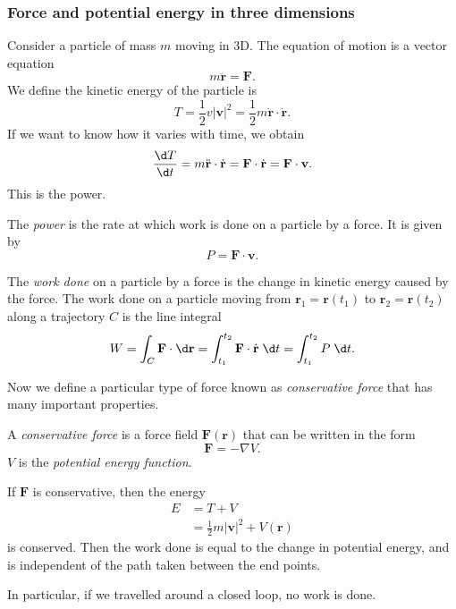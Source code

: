 \documentclass[a4paper]{article}
\begin{document}
\subsubsection{Force and potential energy in three dimensions}
Consider a particle of mass $m$ moving in 3D. The equation of motion is a vector equation
\[
  m\ddot{\mathbf{r}} = \mathbf{F}.
\]
We define the kinetic energy of the particle is
\[
  T = \frac{1}{2}v|\mathbf{v}|^2 = \frac{1}{2}m\dot{\mathbf{r}}\cdot \dot{\mathbf{r}}.
\]
If we want to know how it varies with time, we obtain
\[
  \frac{\d T}{\d t} = m\ddot{\mathbf{r}}\cdot \dot{\mathbf{r}} = \mathbf{F}\cdot \dot{\mathbf{r}} = \mathbf{F}\cdot \mathbf{v}.
\]
This is the power.
\begin{defi}[Power]
  The \emph{power} is the rate at which work is done on a particle by a force. It is given by
  \[
    P = \mathbf{F}\cdot \mathbf{v}.
  \]
\end{defi}
\begin{defi}
  The \emph{work done} on a particle by a force is the change in kinetic energy caused by the force. The work done on a particle moving from $\mathbf{r}_1 = \mathbf{r}(t_1)$ to $\mathbf{r}_2 = \mathbf{r}(t_2)$ along a trajectory $C$ is the line integral
  \[
    W = \int_C \mathbf{F}\cdot\d \mathbf{r} = \int_{t_1}^{t_2} \mathbf{F}\cdot \dot{\mathbf{r}}\;\d t = \int_{t_1}^{t_2} P \;\d t.
  \]
\end{defi}

Now we define a particular type of force known as \emph{conservative force} that has many important properties.
\begin{defi}
  A \emph{conservative force} is a force field $\mathbf{F}(\mathbf{r})$ that can be written in the form
  \[
    \mathbf{F} = -\nabla V.
  \]
  $V$ is the \emph{potential energy function}.
\end{defi}

\begin{prop}
  If $\mathbf{F}$ is conservative, then the energy
  \begin{align*}
    E &= T + V\\
    &= \frac{1}{2}m|\mathbf{v}|^2 + V(\mathbf{r})
  \end{align*}
  is conserved. Then the work done is equal to the change in potential energy, and is independent of the path taken between the end points.

  In particular, if we travelled around a closed loop, no work is done.
\end{prop}
\end{document}

